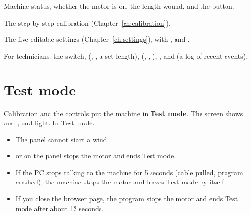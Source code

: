 \begin{description}[style=nextline,leftmargin=1.5em]
  \item[\ui{Home}] Machine status, whether the motor is on, the length wound,
    and the  button.
  \item[\ui{Calibrate}] The step-by-step calibration (Chapter~\ref{ch:calibration}).
  \item[\ui{Settings}] The five editable settings (Chapter~\ref{ch:settings}),
    with ,  and
    .
  \item[\ui{Advanced}] For technicians: the  switch,
     (, ,  a set length),  (,
    , ), ,
     and  (a log of recent events).
\end{description}

\section{Test mode}\label{sec:testmode}
Calibration and the  controls put the machine in \textbf{Test
mode}. The screen shows  and ;  and  light. In Test mode:
\begin{itemize}
  \item The panel cannot start a wind.
  \item {} or  on the panel stops the motor and ends Test mode.
  \item If the PC stops talking to the machine for 5 seconds (cable pulled,
        program crashed), the machine stops the motor and leaves Test mode by
        itself.
  \item If you close the browser page, the program stops the motor and ends
        Test mode after about 12 seconds.
\end{itemize}

